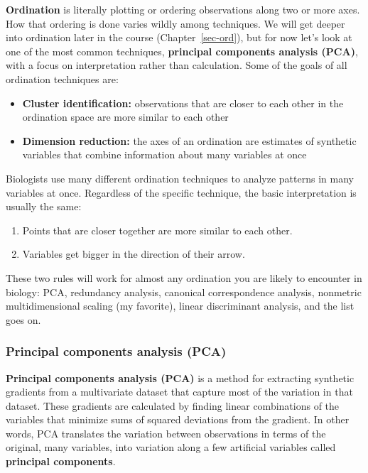 \documentclass[
  13,
  letterpaper,
]{report}
\providecommand{\tightlist}{%
  \setlength{\itemsep}{0pt}\setlength{\parskip}{0pt}}
\begin{document}
\textbf{Ordination} is literally plotting or ordering observations along
two or more axes. How that ordering is done varies wildly among
techniques. We will get deeper into ordination later in the course
(Chapter~\ref{sec-ord}), but for now let's look at one of the most
common techniques, \textbf{principal components analysis (PCA)}, with a
focus on interpretation rather than calculation. Some of the goals of
all ordination techniques are:

\begin{itemize}
\tightlist
\item
  \textbf{Cluster identification:} observations that are closer to each
  other in the ordination space are more similar to each other
\item
  \textbf{Dimension reduction:} the axes of an ordination are estimates
  of synthetic variables that combine information about many variables
  at once
\end{itemize}

Biologists use many different ordination techniques to analyze patterns
in many variables at once. Regardless of the specific technique, the
basic interpretation is usually the same:

\begin{enumerate}
\def\labelenumi{\arabic{enumi}.}
\tightlist
\item
  Points that are closer together are more similar to each other.
\item
  Variables get bigger in the direction of their arrow.
\end{enumerate}

These two rules will work for almost any ordination you are likely to
encounter in biology: PCA, redundancy analysis, canonical correspondence
analysis, nonmetric multidimensional scaling (my favorite), linear
discriminant analysis, and the list goes on.

\subsubsection{Principal components analysis
(PCA)}\label{principal-components-analysis-pca}

\textbf{Principal components analysis (PCA)} is a method for extracting
synthetic gradients from a multivariate dataset that capture most of the
variation in that dataset. These gradients are calculated by finding
linear combinations of the variables that minimize sums of squared
deviations from the gradient. In other words, PCA translates the
variation between observations in terms of the original, many variables,
into variation along a few artificial variables called \textbf{principal
components}.
\end{document}
